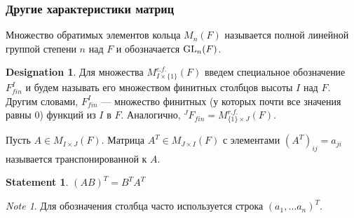 \documentclass[11pt]{book}
\newcommand{\GL}{{\mathop{\text{\rm GL}}}}
\theoremstyle{definition}
\theoremstyle{plain}
\theoremstyle{plain}
\newtheorem{st}{Statement}
\theoremstyle{definition}
\newtheorem*{name}{Designation}
\theoremstyle{remark}
\newtheorem*{note}{Note}
\begin{document}
\subsubsection{Другие характеристики матриц}
\begin{defn}
    Множество обратимых элементов кольца $ M_n(F)$ называется  полной линейной группой степени  $ n$ над  $ F$ и обозначается  $ \GL_{n}(F)$.
\end{defn}
\begin{name}
    Для множества $ M_{I \times \{1\}}^{c.f.}(F)$ введем специальное обозначение $ F^{I}_{fin}$ и будем называть его множеством финитных столбцов высоты $ I$ над  $ F$. Другим словами, $ F_{fin}^{I}$ --- множество финитных (у которых почти все значения равны 0) функций из $ I$ в  $ F$.
    Аналогично, $ ^J\!F_{fin}= M_{\{1\}\times J}^{r.f.}(F)$.
\end{name}
\begin{defn}
    Пусть $ A \in M_{I \times J}(F)$. Матрица $ A^{T} \in M_{J \times I}(F)$ с элементами $ (A^{T})_{ij} = a_{ji}$ называется транспонированной к $ A$.
\end{defn}
\begin{st}
    $ (AB)^{T} = B^{T}A^{T}$
\end{st}
\begin{note}
    Для обозначения столбца часто используется строка $ (a_1, \ldots a_n)^{T}$.
\end{note}
\end{document}
